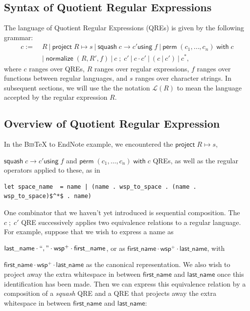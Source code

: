 \documentclass{svproc}
\newcommand{\kw}[1]{\ensuremath{\mathsf{#1}}}
\newcommand{\project}[2]{\ensuremath{\kw{project} \; #1 \mapsto #2}}
\newcommand{\squash}[3]{\ensuremath{\kw{squash} \; #1 \rightarrow #2
\kw{using} \; #3}}
\newcommand{\perm}[2]{\ensuremath{\kw{perm}\; (#1)\; \kw{with}\; #2}}
\newcommand{\normalize}[3]{\ensuremath{\kw{normalize} \; (#1, #2, #3)}}
\newcommand{\sep}{\ensuremath{\ | \ }}
\newcommand{\bibtex}{\textsc{Bib}\TeX{}}
\newcommand{\semicolon}{\ensuremath{\; ; \;}}
\begin{document}
\subsection{Syntax of Quotient Regular Expressions}
The language of Quotient Regular Expressions (QREs) is given by the following
grammar: 
\begin{align*}
c := \; &R \sep \project{R}{s} \sep \squash{c}{c'}{f} \sep
\perm{c_1, \ldots, c_n}{c} \\
  & | \; \normalize{R}{R'}{f} \sep c \semicolon c' \sep c \cdot c' \sep (c \sep
  c') \sep c^*,
\end{align*}
where $c$ ranges over QREs, $R$ ranges over regular expressions, $f$ ranges over
functions between regular languages, and $s$ ranges over character strings. In
subsequent sections, we will use the the notation $\mathcal{L}(R)$ to mean the
language accepted by the regular expression $R$.

\subsection{Overview of Quotient Regular Expression}
In the \bibtex{} to EndNote example, we encountered the $\project{R}{s}$,

\noindent $\squash{c}{c'}{f}$ and $\perm{c_1, \ldots, c_n}{c}$ QREs, as well as
the regular operators applied to these, as in

\begin{lstlisting}
let space_name  = name | (name . wsp_to_space . (name . wsp_to_space)$^*$ . name)
\end{lstlisting}

One combinator that we haven't yet introduced is sequential composition.
The $c \semicolon c'$ QRE successively applies
two equivalence relations to a regular language. For example, suppose that
we wish to express a name as

\noindent $\kw{last\_name \cdot ``,\text{''} \cdot wsp^+ \cdot first\_name}$,
or as $\kw{first\_name\cdot wsp^+ \cdot last\_name}$, with 

\noindent $\kw{first\_name\cdot wsp^+ \cdot last\_name}$ as the canonical
representation. We also wish to project away the extra whitespace in between
\kw{first\_name} and \kw{last\_name} once this identification has been made.
Then we can express this equivalence relation by a composition of a
\textit{squash} QRE and a QRE that projects away the extra whitespace in between
\kw{first\_name} and \kw{last\_name}:
\end{document}
